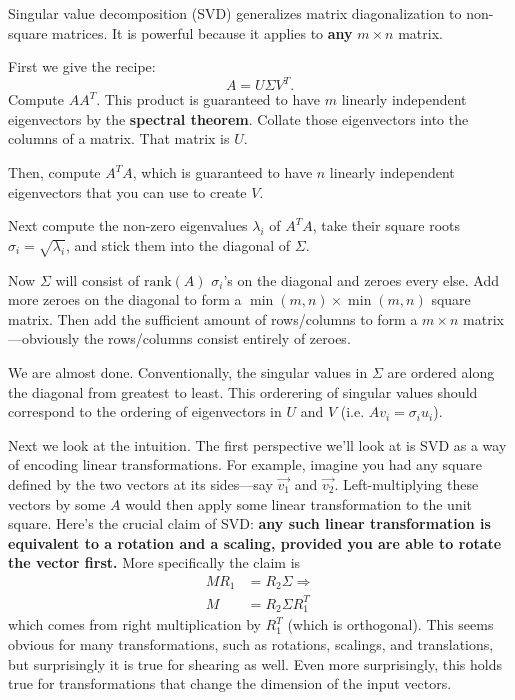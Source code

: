 \documentclass{article}
\begin{document}
Singular value decomposition (SVD) generalizes matrix diagonalization to non-square matrices. 
It is powerful because it applies to \textbf{any} $m \times n$ matrix.

First we give the recipe: 
\begin{equation} 
    A = U \Sigma V^T. \label{eq:SVD} \tag{SVD}
\end{equation}
Compute $AA^T$. This product is guaranteed to have $m$ linearly independent eigenvectors by the 
\textbf{spectral theorem}. Collate those eigenvectors into the columns of a matrix. That matrix is $U$. 

Then, compute $A^TA$, which is guaranteed to have $n$ linearly independent eigenvectors 
that you can use to create $V$.

Next compute the non-zero eigenvalues $\lambda_i$ of $A^TA$, take their square roots 
$\sigma_i = \sqrt{\lambda_i}$, and stick them into the diagonal of $\Sigma$. 

Now $\Sigma$ will consist of $\text{rank}(A)$ $\sigma_i$'s on the diagonal and zeroes every else.
Add more zeroes on the diagonal to form a $\min(m, n) \times \min(m, n)$ square matrix. Then add the sufficient
amount of rows/columns to form a $m \times n$ matrix---obviously the rows/columns consist 
entirely of zeroes.

We are almost done. Conventionally, the singular values in $\Sigma$ are ordered along the diagonal
from greatest to least. This orderering of singular values should correspond to the ordering of 
eigenvectors in $U$ and $V$ (i.e. $Av_i = \sigma_iu_i$).

Next we look at the intuition. The first perspective we'll look at is SVD as a way of encoding linear transformations.
For example, imagine you had any square defined by the two vectors at its sides---say $\vec{v_1}$
and $\vec{v_2}$. Left-multiplying these vectors by some $A$ would then apply some linear transformation
to the unit square. Here's the crucial claim of SVD: \textbf{any such linear transformation is equivalent
to a rotation and a scaling, provided you are able to rotate the vector first.} More specifically the 
claim is 
\begin{align}
MR_1 &= R_2\Sigma \Rightarrow \nonumber \\
M &= R_2 \Sigma R_1^T \nonumber
\end{align}
which comes from right multiplication by $R_1^T$ (which is orthogonal). This seems obvious for many
transformations, such as rotations, scalings, and translations, but surprisingly it
is true for shearing as well. Even more surprisingly, this holds true for transformations that change
the dimension of the input vectors.
\end{document}
